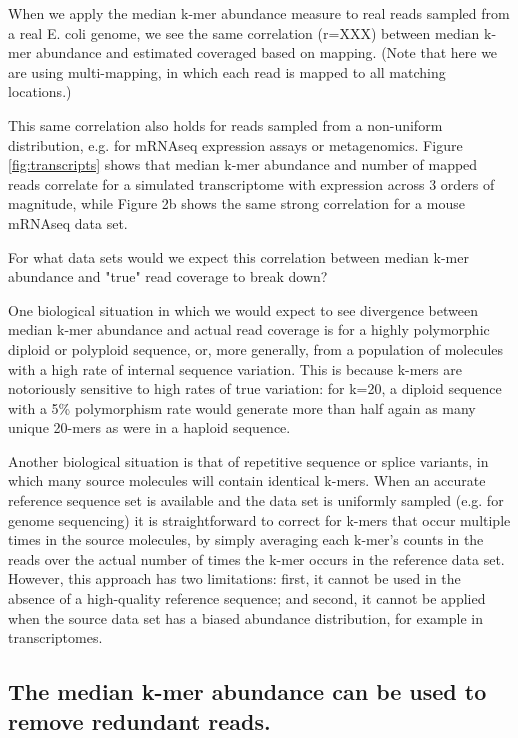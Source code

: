 \documentclass[10pt,draft]{article}
\begin{document}
When we apply the median k-mer abundance measure to real reads sampled
from a real E. coli genome, we see the same correlation (r=XXX)
between median k-mer abundance and estimated coveraged based on mapping.
(Note that here we are using multi-mapping, in which each read is mapped
to all matching locations.)

This same correlation also holds for reads sampled from a non-uniform
distribution, e.g. for mRNAseq expression assays or metagenomics.
Figure \ref{fig:transcripts} shows that median k-mer abundance and number of mapped reads
correlate for a simulated transcriptome with expression across 3
orders of magnitude, while Figure 2b shows the same strong correlation
for a mouse mRNAseq data set.

For what data sets would we expect this correlation between median
k-mer abundance and "true" read coverage to break down?

One biological situation in which we would expect to see divergence
between median k-mer abundance and actual read coverage is for a
highly polymorphic diploid or polyploid sequence, or, more generally,
from a population of molecules with a high rate of internal sequence
variation.  This is because k-mers are notoriously sensitive to high
rates of true variation: for k=20, a diploid sequence with a 5\%
polymorphism rate would generate more than half again as many unique
20-mers as were in a haploid sequence.

Another biological situation is that of repetitive sequence or splice
variants, in which many source molecules will contain identical
k-mers.  When an accurate reference sequence set is available and the
data set is uniformly sampled (e.g. for genome sequencing) it is
straightforward to correct for k-mers that occur multiple times in the
source molecules, by simply averaging each k-mer's counts in the reads
over the actual number of times the k-mer occurs in the reference data
set.  However, this approach has two limitations: first, it cannot be
used in the absence of a high-quality reference sequence; and second,
it cannot be applied when the source data set has a biased abundance
distribution, for example in transcriptomes.


\subsection*{The median k-mer abundance can be used to remove redundant reads.}
\end{document}
